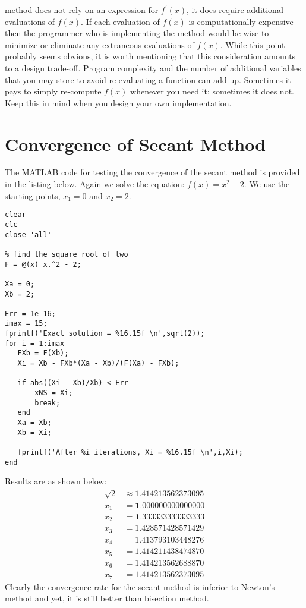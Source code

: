  method does not rely on an expression for $f^{\prime}(x)$, it does require additional evaluations of $f(x)$.  If each evaluation of $f(x)$ is computationally expensive then the programmer who is implementing the method would be wise to minimize or eliminate any extraneous evaluations of $f(x)$.  While this point probably seems obvious, it is worth mentioning that this consideration amounts to a design trade-off.  Program complexity and the number of additional variables that you may store to avoid re-evaluating a function can add up.  Sometimes it pays to simply re-compute $f(x)$ whenever you need it; sometimes it does not.  Keep this in mind when you design your own implementation.

\section{Convergence of Secant Method}
The MATLAB code for testing the convergence of the secant method is provided in the listing below. Again we solve the equation: $f(x) = x^2 - 2$.  We use the starting points, $x_1 = 0$ and $x_2 = 2$.

\begin{lstlisting}[name=lec4n-ex2, style=myMatlab]
clear
clc
close 'all'

% find the square root of two
F = @(x) x.^2 - 2;

Xa = 0; 
Xb = 2;

Err = 1e-16;
imax = 15;
fprintf('Exact solution = %16.15f \n',sqrt(2));
for i = 1:imax
   FXb = F(Xb);
   Xi = Xb - FXb*(Xa - Xb)/(F(Xa) - FXb);
   
   if abs((Xi - Xb)/Xb) < Err
       xNS = Xi;
       break;
   end
   Xa = Xb;
   Xb = Xi;
   
   fprintf('After %i iterations, Xi = %16.15f \n',i,Xi);          
end
\end{lstlisting}
Results are as shown below:
\begin{align*}
\sqrt{2} &\approx 1.414213562373095 \\
x_1 &= \mathbf{1.}000000000000000 \\
x_2 &= \mathbf{1.}333333333333333 \\
x_3 &= \mathbf{1.4}28571428571429 \\
x_4 &= \mathbf{1.41}3793103448276 \\
x_5 &= \mathbf{1.41421}1438474870 \\
x_6 &= \mathbf{1.414213562}688870 \\
x_7 &= \mathbf{1.414213562373095}
\end{align*}
Clearly the convergence rate for the secant method is inferior to Newton's method and yet, it is still better than bisection method.

